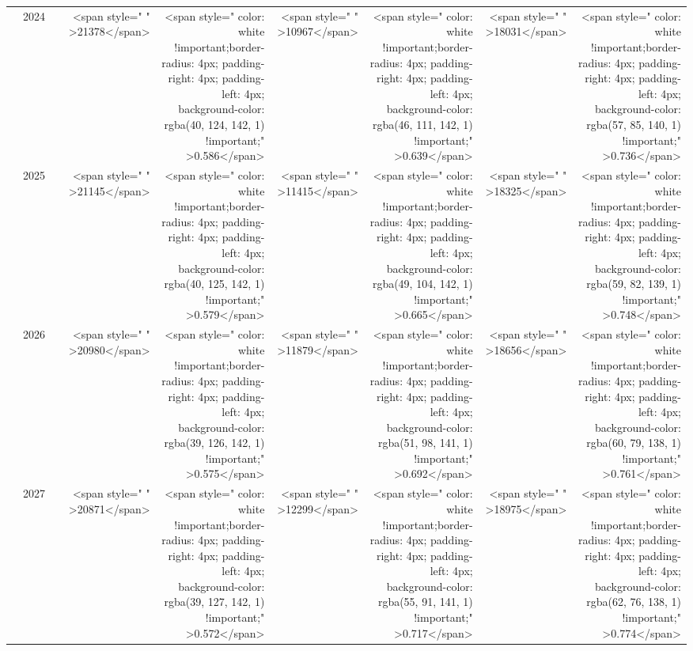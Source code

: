\begin{table}
\begin{tabular}[t]{>{}l|l>{}rr>{}r|rrrr}
 & 2024 & \cellcolor[HTML]{B0A473}{\textcolor{white}{1200}} & <span style="     " >21378</span> & <span style="     color: white !important;border-radius: 4px; padding-right: 4px; padding-left: 4px; background-color: rgba(40, 124, 142, 1) !important;" >0.586</span> & <span style="     " >10967</span> & <span style="     color: white !important;border-radius: 4px; padding-right: 4px; padding-left: 4px; background-color: rgba(46, 111, 142, 1) !important;" >0.639</span> & <span style="     " >18031</span> & <span style="     color: white !important;border-radius: 4px; padding-right: 4px; padding-left: 4px; background-color: rgba(57, 85, 140, 1) !important;" >0.736</span>\\

 & 2025 & \cellcolor[HTML]{B0A473}{\textcolor{white}{1200}} & <span style="     " >21145</span> & <span style="     color: white !important;border-radius: 4px; padding-right: 4px; padding-left: 4px; background-color: rgba(40, 125, 142, 1) !important;" >0.579</span> & <span style="     " >11415</span> & <span style="     color: white !important;border-radius: 4px; padding-right: 4px; padding-left: 4px; background-color: rgba(49, 104, 142, 1) !important;" >0.665</span> & <span style="     " >18325</span> & <span style="     color: white !important;border-radius: 4px; padding-right: 4px; padding-left: 4px; background-color: rgba(59, 82, 139, 1) !important;" >0.748</span>\\

 & 2026 & \cellcolor[HTML]{B0A473}{\textcolor{white}{1200}} & <span style="     " >20980</span> & <span style="     color: white !important;border-radius: 4px; padding-right: 4px; padding-left: 4px; background-color: rgba(39, 126, 142, 1) !important;" >0.575</span> & <span style="     " >11879</span> & <span style="     color: white !important;border-radius: 4px; padding-right: 4px; padding-left: 4px; background-color: rgba(51, 98, 141, 1) !important;" >0.692</span> & <span style="     " >18656</span> & <span style="     color: white !important;border-radius: 4px; padding-right: 4px; padding-left: 4px; background-color: rgba(60, 79, 138, 1) !important;" >0.761</span>\\

 & 2027 & \cellcolor[HTML]{B0A473}{\textcolor{white}{1200}} & <span style="     " >20871</span> & <span style="     color: white !important;border-radius: 4px; padding-right: 4px; padding-left: 4px; background-color: rgba(39, 127, 142, 1) !important;" >0.572</span> & <span style="     " >12299</span> & <span style="     color: white !important;border-radius: 4px; padding-right: 4px; padding-left: 4px; background-color: rgba(55, 91, 141, 1) !important;" >0.717</span> & <span style="     " >18975</span> & <span style="     color: white !important;border-radius: 4px; padding-right: 4px; padding-left: 4px; background-color: rgba(62, 76, 138, 1) !important;" >0.774</span>\\


\end{tabular}
\end{table}
